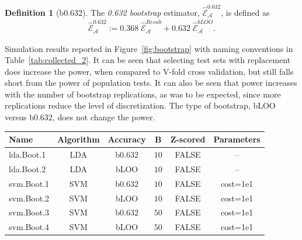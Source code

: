\documentclass[12pt,a4paper]{article}
\theoremstyle{definition}
\newtheorem{definition}{Definition}
\newcommand{\accEstim}{\hat{\mathcal{E}}}
\newcommand{\algo}{\mathcal{A}}
\begin{document}
\begin{definition}[b$0.632$]
\label{def:b0632}
The \emph{0.632 bootstrap} estimator, $\accEstim_{\algo}^{0.632}$, is defined as 
\begin{align}
	\accEstim_{\algo}^{0.632} := 0.368 \; \accEstim_{\algo}^{Resub}  + 0.632 \; \accEstim_{\algo}^{bLOO}.
\end{align}
\end{definition}
Simulation results reported in Figure~\ref{fig:bootstrap} with naming conventions in Table~\ref{tab:collected_2}.
It can be seen that selecting test sets with replacement does increase the power, when compared to V-fold cross validation, but still falls short from the power of population tests. 
It can also be seen that power increases with the number of bootstrap replications, as was to be expected, since more replications reduce the level of discretization.
The type of bootstrap, bLOO versus b$0.632$, does not change the power. 

\bigskip

\begin{tcolorbox}
\centering
\begin{tabular}{l|c|c|c|c|c}
Name & Algorithm & Accuracy & B & Z-scored & Parameters\\ 
\hline
\hline
lda.Boot.1 & LDA & b$0.632$ & $10$ & FALSE &  -- \\ 
lda.Boot.2 & LDA & bLOO 	& $10$ & FALSE &  -- \\ 
svm.Boot.1 & SVM & b$0.632$ & $10$ & FALSE & cost=1e1 \\ 
svm.Boot.2 & SVM & bLOO 	& $10$ & FALSE & cost=1e1 \\ 
svm.Boot.3 & SVM & b$0.632$ & $50$ & FALSE & cost=1e1 \\ 
svm.Boot.4 & SVM & bLOO 	& $50$ & FALSE & cost=1e1 \\ 
\end{tabular} 
\captionsetup{type=table}
\caption{
The same as Table~\ref{tab:collected} for bootstraped accuracy estimates. 
bLOO and b$0.632$ are defined in definitions~\ref{def:bloo} and \ref{def:b0632} respectively.
$B$ denotes the number of Bootstrap samples. } 
\label{tab:collected_2}
\end{tcolorbox}
\end{document}

